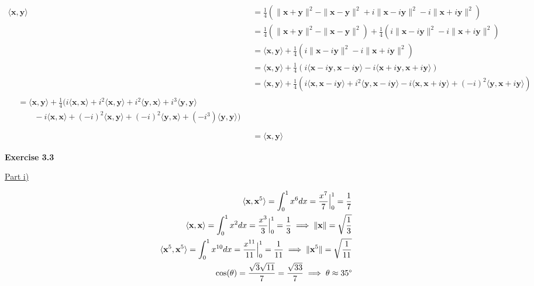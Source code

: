 \documentclass[letterpaper,12pt]{article}
\newcommand{\vect}[1]{\mathbf{#1}}
\begin{document}
\begin{align*}
  \langle \vect{x}, \vect{y} \rangle &= \frac{1}{4}(\|\vect{x} + \vect{y}\|^2 - \|\vect{x} - \vect{y}\|^2 + i\|\vect{x} - i\vect{y}\|^2 - i\|\vect{x} + i\vect{y}\|^2) \\
  &= \frac{1}{4}(\|\vect{x} + \vect{y}\|^2 - \|\vect{x} - \vect{y}\|^2) + \frac{1}{4} (i\|\vect{x} - i\vect{y}\|^2 - i\|\vect{x} + i\vect{y}\|^2) \\
  &= \langle \vect{x}, \vect{y} \rangle + \frac{1}{4} (i\|\vect{x} - i\vect{y}\|^2 - i\|\vect{x} + i\vect{y}\|^2) \\
  &= \langle \vect{x}, \vect{y} \rangle + \frac{1}{4} (i\langle \vect{x} - i\vect{y}, \vect{x} - i\vect{y} \rangle - i\langle \vect{x} + i\vect{y}, \vect{x} + i\vect{y} \rangle) \\
  &= \langle \vect{x}, \vect{y} \rangle + \frac{1}{4}
  (i \langle \vect{x}, \vect{x} - i\vect{y} \rangle +  i^2 \langle \vect{y}, \vect{x} - i\vect{y} \rangle - i \langle \vect{x}, \vect{x} + i\vect{y} \rangle + (-i)^2 \langle \vect{y}, \vect{x} + i\vect{y} \rangle) \\
\begin{split}
    &= \langle \vect{x}, \vect{y} \rangle + \frac{1}{4}
    (i \langle \vect{x}, \vect{x} \rangle + i^2 \langle \vect{x}, \vect{y} \rangle + i^2 \langle \vect{y}, \vect{x} \rangle + i^3 \langle \vect{y}, \vect{y} \rangle \\
    &\qquad - i \langle \vect{x}, \vect{x} \rangle + (-i)^2 \langle \vect{x}, \vect{y} \rangle + (-i)^2 \langle \vect{y}, \vect{x} \rangle + (-i^3) \langle \vect{y}, \vect{y} \rangle)\ \\
\end{split}\\
  &= \langle \vect{x}, \vect{y} \rangle
\end{align*}

\textbf{Exercise 3.3}

\underline{Part i)}

\begin{align*}
  \langle \vect{x}, \vect{x}^5 \rangle = \int_0^1 x^6 dx = \frac{x^7}{7} \Big|_0^1 = \frac{1}{7} \\
  \langle \vect{x}, \vect{x} \rangle = \int_0^1 x^2 dx = \frac{x^3}{3} \Big|_0^1 = \frac{1}{3} 
  \implies \|\vect{x}\| = \sqrt{\frac{1}{3}} \\
  \langle \vect{x}^5, \vect{x}^5 \rangle = \int_0^1 x^{10} dx = \frac{x^{11}}{11} \Big|_0^{1} = \frac{1}{11} \implies \|\vect{x}^5\| = \sqrt{\frac{1}{11}} \\
  \cos(\theta) = \frac{\sqrt{3} \sqrt{11}}{7} = \frac{\sqrt{33}}{7}
  \implies \theta \approx 35 \degree
\end{align*}
  
\end{document}
